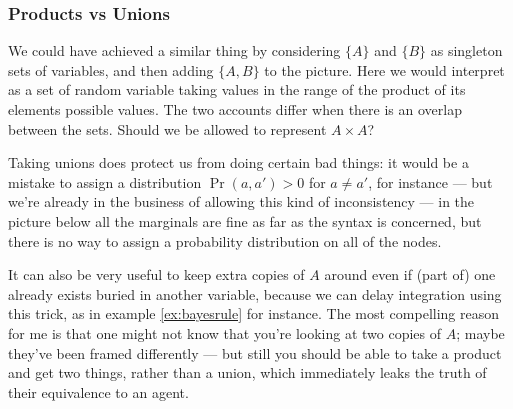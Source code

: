 \documentclass{article}
\begin{document}
	
	\subsubsection{Products vs Unions}
	
	We could have achieved a similar thing by considering $\{A\}$ and $\{B\}$ as singleton sets of variables, and then adding $\{A,B\}$ to the picture. Here we would interpret as a set of random variable taking values in the range of the product of its elements possible values. The two accounts differ when there is an overlap between the sets. Should we be allowed to represent $A \times A$? 
	
	Taking unions does protect us from doing certain bad things: it would be a mistake to assign a distribution $\Pr(a, a') > 0$ for $ a \neq a'$, for instance --- but we're already in the business of allowing this kind of inconsistency --- in the picture below all the marginals are fine as far as the syntax is concerned, but there is no way to assign a probability distribution on all of the nodes.
	\begin{center}
	\end{center}

	It can also be very useful to keep extra copies of $A$ around even if (part of) one already exists buried in another variable, because we can delay integration using this trick, as in example \ref{ex:bayesrule} for instance. The most compelling reason for me is that one might not know that you're looking at two copies of $A$; maybe they've been framed differently --- but still you should be able to take a product and get two things, rather than a union, which immediately leaks the truth of their equivalence to an agent.
	
	
	
	
	
	
	
	
\end{document}
